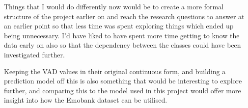 Things that I would do differently now would be to create a more formal structure of the project earlier on and reach the research questions to answer at an earlier point so that less time was spent exploring things which ended up being unnecessary. I'd have liked to have spent more time getting to know the data early on also so that the dependency between the classes could have been investigated further. 

Keeping the VAD values in their original continuous form, and building a prediction model off this is also something that would be interesting to explore further, and comparing this to the model used in this project would offer more insight into how the Emobank dataset can be utilised.
